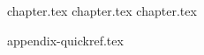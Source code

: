 \documentclass[11pt,a4paper,twoside,openright]{book}
\begin{document}
\frontmatter


\cleardoublepage
\tableofcontents
\cleardoublepage

\mainmatter

{chapter.tex}
{chapter.tex}
{chapter.tex}

\appendix
{appendix-quickref.tex}
\end{document}
